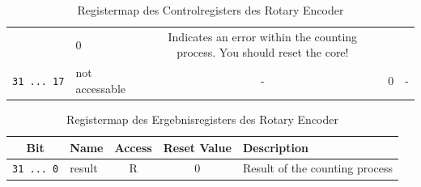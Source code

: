 \begin{table}
\begin{longtable}[]{@{}clccl@{}}
\begin{minipage}[t]{0.12\columnwidth}
							\end{minipage} & \begin{minipage}[t]{0.17\columnwidth}\centering\strut
							0\strut
							\end{minipage} & \begin{minipage}[t]{0.15\columnwidth}\raggedright\strut
							Indicates an error within the counting process. You should reset the
							core!\strut
							\end{minipage}\tabularnewline
							\begin{minipage}[t]{0.13\columnwidth}\centering\strut
								\texttt{31\ ...\ 17}\strut
								\end{minipage} & \begin{minipage}[t]{0.08\columnwidth}\raggedright\strut
								not accessable\strut
								\end{minipage} & \begin{minipage}[t]{0.12\columnwidth}\centering\strut
								-\strut
								\end{minipage} & \begin{minipage}[t]{0.17\columnwidth}\centering\strut
								0\strut
								\end{minipage} & \begin{minipage}[t]{0.15\columnwidth}\raggedright\strut
								-\strut
								\end{minipage}\tabularnewline

\end{longtable}
\caption{Registermap des Controlregisters des Rotary Encoder}
\label{hw:rotary:control}
\end{table}

\begin{table}
	\begin{longtable}[]{@{}clccl@{}}
		\textbf{Bit} & \textbf{Name} & \textbf{Access} & \textbf{Reset Value} &
		\textbf{Description}\tabularnewline
		\endhead
		\texttt{31\ ...\ 0} & result & R & 0 & Result of the counting
		process\tabularnewline
	\end{longtable}
	\caption{Registermap des Ergebnisregisters des Rotary Encoder}
	\label{hw:rotary:result}
\end{table}
